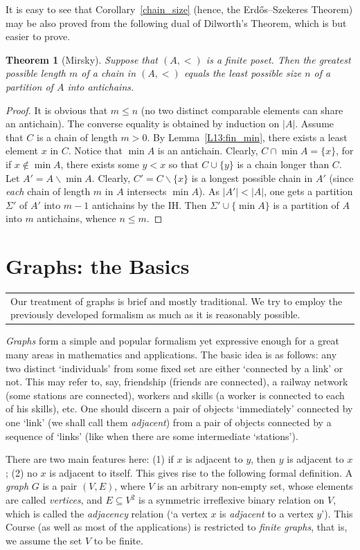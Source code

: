 \documentclass[12pt,notitlepage]{article}
\theoremstyle{plain}
\newtheorem{thm}{Theorem}[section]
\theoremstyle{definition}
\theoremstyle{plain}
\newcommand{\sbs}{\subseteq}
\renewcommand{\setminus}{\smallsetminus}
\newcommand{\1}{\mathbf{1}}
\newcommand{\0}{\mathbf{0}}
\newcommand{\mcomm}[1]{
\medskip\noindent\begin{tabular}{| l}
\parbox{0.99\textwidth}{{\small
#1 }}\end{tabular}
\smallskip}
\begin{document}
It is easy to see that Corollary~\ref{chain_size} (hence, the Erd\H{o}s--Szekeres Theorem) may be also proved from the following dual of Dilworth's Theorem, which is but easier to prove.

\begin{thm}[Mirsky]
Suppose that $(A, <)$ is a finite poset. Then the greatest possible length $m$ of a chain in $(A, <)$ equals the least possible size $n$ of a partition of $A$ into antichains.
\end{thm}
\begin{proof}
It is obvious that $m \leq n$ (no two distinct comparable elements can share an antichain). The converse equality is obtained by induction on $|A|$. Assume that $C$ is a chain of length $m > 0$. By Lemma~\ref{L13:fin_min}, there exists a least element $x$ in $C$. Notice that $\min A$ is an antichain. Clearly, $C \cap \min A = \{ x \}$, for if $x \notin \min A$, there exists some $y < x$ so that $C \cup \{y\}$ is a chain longer than $C$. Let $A' = A \setminus \min A$. Clearly, $C' = C \setminus \{x\}$ is a longest possible chain in $A'$ (since \emph{each} chain of length $m$ in $A$ intersects $\min A$). As $|A'| < |A|$, one gets a partition $\Sigma'$ of $A'$ into $m - 1$ antichains by the IH. Then $\Sigma' \cup \{ \min A \}$ is a partition of $A$ into $m$ antichains, whence $n \leq m$.
\end{proof}

\newpage
\section{Graphs: the Basics}
\mcomm{Our treatment of graphs is brief and mostly traditional. We try to employ the previously developed formalism as much as it is reasonably possible.}

\emph{Graphs} form a simple and popular formalism yet expressive enough for a great many areas in mathematics and applications. The basic idea is as follows: any two distinct `individuals' from some fixed set are either `connected by a link' or not. This may refer to, say, friendship (friends are connected), a railway network (some stations are connected), workers and skills (a worker is connected to each of his skills), etc. One should discern a pair of objects `immediately' connected by one `link' (we shall call them \emph{adjacent}) from a pair of objects connected by a sequence of `links' (like when there are some intermediate `stations'). 

There are two main features here: (1) if $x$ is adjacent to $y$, then $y$ is adjacent to $x$; (2) no $x$ is adjacent to itself. This gives rise to the following formal definition. A \emph{graph} $G$ is a pair $(V, E)$, where $V$ is an arbitrary non-empty set, whose elements are called \emph{vertices}, and $E \sbs V^2$ is a symmetric irreflexive binary relation on $V$, which is called the \emph{adjacency} relation (`a vertex $x$ is \emph{adjacent} to a vertex $y$'). This Course (as well as most of the applications) is restricted to \emph{finite graphs}, that is, we assume the set $V$ to be finite.
\end{document}
